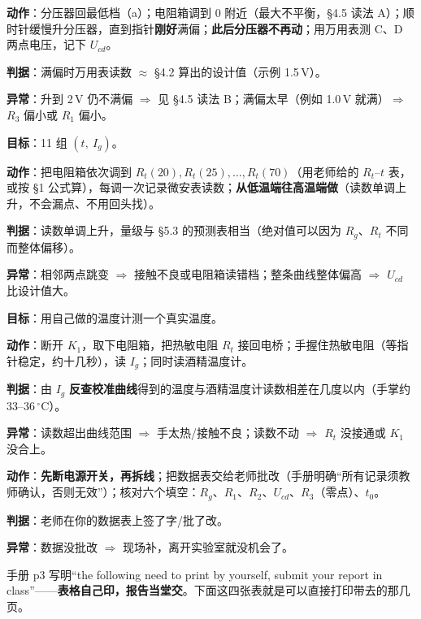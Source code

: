\documentclass[11pt]{ctexart}
\newcommand{\degC}{\ensuremath{\,^\circ\mathrm{C}}}
\begin{document}
\textbf{动作}：分压器回最低档（a）；电阻箱调到 0 附近（最大不平衡，§4.5 读法 A）；顺时针缓慢升分压器，直到指针\textbf{刚好}满偏；\textbf{此后分压器不再动}；用万用表测 C、D 两点电压，记下 $U_{cd}$。

\textbf{判据}：满偏时万用表读数 $\approx$ §4.2 算出的设计值（示例 1.5\,V）。

\textbf{异常}：升到 2\,V 仍不满偏 $\Rightarrow$ 见 §4.5 读法 B；满偏太早（例如 1.0\,V 就满）$\Rightarrow$ $R_3$ 偏小或 $R_1$ 偏小。


\textbf{目标}：11 组 $(t,\ I_g)$。

\textbf{动作}：把电阻箱依次调到 $R_t(20),R_t(25),\ldots,R_t(70)$（用老师给的 $R_t$–$t$ 表，或按 §1 公式算），每调一次记录微安表读数；\textbf{从低温端往高温端做}（读数单调上升，不会漏点、不用回头找）。

\textbf{判据}：读数单调上升，量级与 §5.3 的预测表相当（绝对值可以因为 $R_g$、$R_t$ 不同而整体偏移）。

\textbf{异常}：相邻两点跳变 $\Rightarrow$ 接触不良或电阻箱读错档；整条曲线整体偏高 $\Rightarrow$ $U_{cd}$ 比设计值大。


\textbf{目标}：用自己做的温度计测一个真实温度。

\textbf{动作}：断开 $K_1$，取下电阻箱，把热敏电阻 $R_t$ 接回电桥；手握住热敏电阻（等指针稳定，约十几秒），读 $I_g$；同时读酒精温度计。

\textbf{判据}：由 $I_g$ \textbf{反查校准曲线}得到的温度与酒精温度计读数相差在几度以内（手掌约 33--36\degC）。

\textbf{异常}：读数超出曲线范围 $\Rightarrow$ 手太热/接触不良；读数不动 $\Rightarrow$ $R_t$ 没接通或 $K_1$ 没合上。


\textbf{动作}：\textbf{先断电源开关，再拆线}；把数据表交给老师批改（手册明确“所有记录须教师确认，否则无效”）；核对六个填空：$R_g$、$R_1$、$R_2$、$U_{cd}$、$R_3$（零点）、$t_0$。

\textbf{判据}：老师在你的数据表上签了字/批了改。

\textbf{异常}：数据没批改 $\Rightarrow$ 现场补，离开实验室就没机会了。


手册 p3 写明“the following need to print by yourself, submit your report in class”——\textbf{表格自己印，报告当堂交}。下面这四张表就是可以直接打印带去的那几页。
\end{document}
